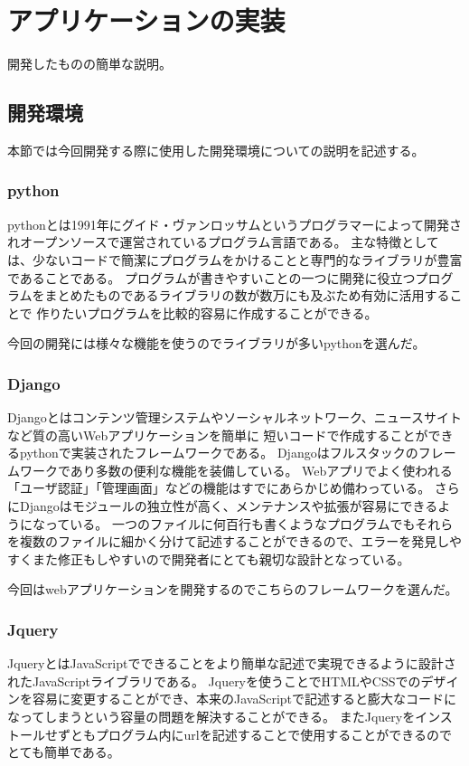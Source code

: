 \chapter{アプリケーションの実装}
\label{cha:Development}
開発したものの簡単な説明。

\section{開発環境}
本節では今回開発する際に使用した開発環境についての説明を記述する。

\subsection{python}
pythonとは1991年にグイド・ヴァンロッサムというプログラマーによって開発されオープンソースで運営されているプログラム言語である。
主な特徴としては、少ないコードで簡潔にプログラムをかけることと専門的なライブラリが豊富であることである。
プログラムが書きやすいことの一つに開発に役立つプログラムをまとめたものであるライブラリの数が数万にも及ぶため有効に活用することで
作りたいプログラムを比較的容易に作成することができる。

今回の開発には様々な機能を使うのでライブラリが多いpythonを選んだ。

\subsection{Django}
Djangoとはコンテンツ管理システムやソーシャルネットワーク、ニュースサイトなど質の高いWebアプリケーションを簡単に
短いコードで作成することができるpythonで実装されたフレームワークである。
Djangoはフルスタックのフレームワークであり多数の便利な機能を装備している。
Webアプリでよく使われる「ユーザ認証」「管理画面」などの機能はすでにあらかじめ備わっている。
さらにDjangoはモジュールの独立性が高く、メンテナンスや拡張が容易にできるようになっている。
一つのファイルに何百行も書くようなプログラムでもそれらを複数のファイルに細かく分けて記述することができるので、エラーを発見しやすくまた修正もしやすいので開発者にとても親切な設計となっている。

今回はwebアプリケーションを開発するのでこちらのフレームワークを選んだ。

\subsection{Jquery}
JqueryとはJavaScriptでできることをより簡単な記述で実現できるように設計されたJavaScriptライブラリである。
Jqueryを使うことでHTMLやCSSでのデザインを容易に変更することができ、本来のJavaScriptで記述すると膨大なコードになってしまうという容量の問題を解決することができる。
またJqueryをインストールせずともプログラム内にurlを記述することで使用することができるのでとても簡単である。

